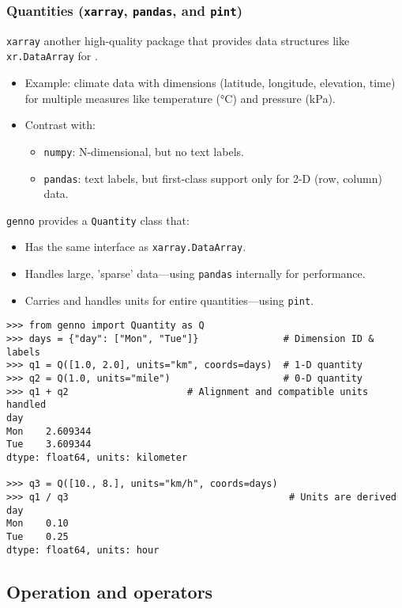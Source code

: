 \documentclass[12pt,aspectratio=169]{beamer}
\renewcommand{\mod}[1]{\texttt{#1}}
\newcommand{\py}[1]{\texttt{#1}}
\begin{document}
\begin{frame}
\frametitle{Quantities (\texttt{xarray}, \texttt{pandas}, and \texttt{pint})}

\mod{xarray} another high-quality package that provides data structures like \py{xr.DataArray}
for .
\begin{itemize}
  \item Example: climate data with dimensions (latitude, longitude, elevation, time)
    for multiple measures like temperature (°C) and pressure (kPa).
  \item Contrast with:
    \begin{itemize}
      \item \mod{numpy}: N-dimensional, but no text labels.
      \item \mod{pandas}: text labels, but first-class support only for 2-D (row, column) data.
    \end{itemize}
\end{itemize}

\medskip
\mod{genno} provides a \py{Quantity} class that:
\begin{itemize}
  \item Has the same interface as \py{xarray.DataArray}.
  \item Handles large, 'sparse' data—using \mod{pandas} internally for performance.
  \item Carries and handles units for entire quantities—using \mod{pint}.
\end{itemize}

\framebreak
\begin{verbatim}
>>> from genno import Quantity as Q
>>> days = {"day": ["Mon", "Tue"]}               # Dimension ID & labels
>>> q1 = Q([1.0, 2.0], units="km", coords=days)  # 1-D quantity
>>> q2 = Q(1.0, units="mile")                    # 0-D quantity
>>> q1 + q2                     # Alignment and compatible units handled
day
Mon    2.609344
Tue    3.609344
dtype: float64, units: kilometer

>>> q3 = Q([10., 8.], units="km/h", coords=days)
>>> q1 / q3                                       # Units are derived
day
Mon    0.10
Tue    0.25
dtype: float64, units: hour
\end{verbatim}
\end{frame}

\subsection{Operation and operators}
\end{document}
